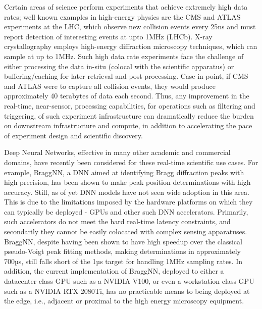 Certain areas of science perform experiments that achieve extremely high data rates; well known examples in high-energy physics are the CMS and ATLAS experiments at the LHC, which observe new collision events every 25ns and must report detection of interesting events at upto 1MHz\cite{pmlr-v42-glig14} (LHCb).
X-ray crystallography employs high-energy diffraction microscopy techniques, which can sample at up to 1MHz\cite{doi:10.1063/5.0006531}.
Such high data rate experiments face the challenge of either processing the data in-situ (colocal with the scientific apparatus) or buffering/caching for later retrieval and post-processing.
Case in point, if CMS and ATLAS were to capture all collision events, they would produce approximately 40 terabytes of data each second\cite{BORK2021100619}.
Thus, any improvement in the real-time, near-sensor, processing capabilities, for operations such as filtering and triggering, of such experiment infrastructure can dramatically reduce the burden on downstream infrastructure and compute, in addition to accelerating the pace of experiment design and scientific discovery.

Deep Neural Networks, effective in many other academic and commercial domains, have recently been considered for these real-time scientific use cases\cite{Guest:2018yhq}.
For example, BraggNN, a DNN aimed at identifying Bragg diffraction peaks with high precision, has been shown to make peak position determinations with high accuracy.
Still, as of yet DNN models have not seen wide adoption in this area.
This is due to the limitations imposed by the hardware platforms on which they can typically be deployed - GPUs and other such DNN accelerators.
Primarily, such accelerators do not meet the hard real-time latency constraints, and secondarily they cannot be easily colocated with complex sensing apparatuses.
BraggNN, despite having been shown to have high speedup over the classical pseudo-Voigt peak fitting methods, making determinations in approximately 700µs, still falls short of the 1µs target for handling 1MHz sampling rates.
In addition, the current implementation of BraggNN, deployed to either a datacenter class GPU such as a NVIDIA V100, or even a workstation class GPU such as a NVIDIA RTX 2080Ti, has no practicable means to being deployed at the edge, i.e., adjacent or proximal to the high energy microscopy equipment.

